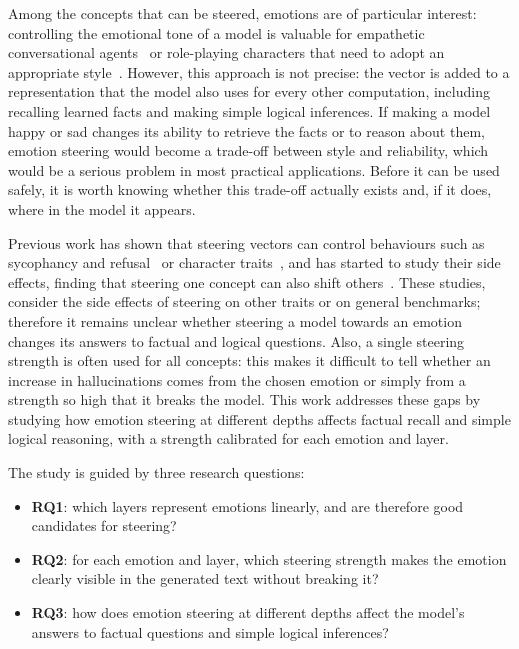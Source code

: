 \documentclass{article}
\begin{document}
Among the concepts that can be steered, emotions are of particular interest: controlling the emotional tone of a model is valuable for empathetic conversational agents~\cite{rashkin2019empathetic, zhou2018emotionalchat} or role-playing characters that need to adopt an appropriate style~\cite{chen2024persona}. However, this approach is not precise: the vector is added to a representation that the model also uses for every other computation, including recalling learned facts and making simple logical inferences. If making a model happy or sad changes its ability to retrieve the facts or to reason about them, emotion steering would become a trade-off between style and reliability, which would be a serious problem in most practical applications. Before it can be used safely, it is worth knowing whether this trade-off actually exists and, if it does, where in the model it appears.


Previous work has shown that steering vectors can control behaviours such as sycophancy and refusal~\cite{panickssery2024steerllama2} or character traits~\cite{chen2025personavectors}, and has started to study their side effects, finding that steering one concept can also shift others~\cite{bhandari-etal-2026-personality}. These studies, consider the side effects of steering on other traits or on general benchmarks; therefore it remains unclear whether steering a model towards an emotion changes its answers to factual and logical questions. Also, a single steering strength is often used for all concepts: this makes it difficult to tell whether an increase in hallucinations comes from the chosen emotion or simply from a strength so high that it breaks the model. This work addresses these gaps by studying how emotion steering at different depths affects factual recall and simple logical reasoning, with a strength calibrated for each emotion and layer.

The study is guided by three research questions:    
\begin{itemize}
  \item \textbf{RQ1}: which layers represent emotions linearly, and are therefore good candidates for steering?
  \item \textbf{RQ2}: for each emotion and layer, which steering strength makes the emotion clearly visible in the generated text without breaking it?
  \item \textbf{RQ3}: how does emotion steering at different depths affect the model's answers to factual questions and simple logical inferences?
\end{itemize}
\end{document}
